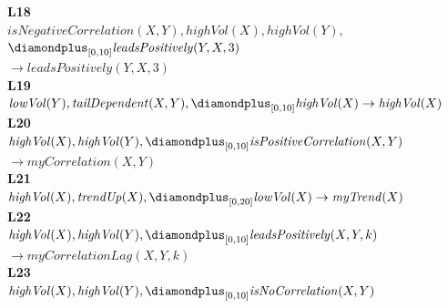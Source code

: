 \begin{figure}[t]
{\begin{minipage}{0.95\textwidth}
\textbf{L18}\\
\hspace*{1.5em}\mbox{$\mathit{isNegativeCorrelation}(X,Y), \mathit{highVol}(X), \mathit{highVol}(Y),$}\\
\hspace*{1.5em}\hspace*{1.5em}\mbox{$\diamondplus_{[0,10]} \mathit{leadsPositively}(Y,X,3)$}\\
\hspace*{1.5em}\hspace*{3em}\mbox{$\to \mathit{leadsPositively}(Y,X,3)$}\\[4pt]
\textbf{L19}\\
\hspace*{1.5em}\mbox{$\mathit{lowVol}(Y), \mathit{tailDependent}(X,Y), \diamondplus_{[0,10]} \mathit{highVol}(X) \to \mathit{highVol}(X)$}\\[4pt]
\textbf{L20}\\
\hspace*{1.5em}\mbox{$\mathit{highVol}(X), \mathit{highVol}(Y), \diamondplus_{[0,10]} \mathit{isPositiveCorrelation}(X,Y)$}\\
\hspace*{1.5em}\hspace*{3em}\mbox{$\to \mathit{myCorrelation}(X,Y)$}\\[4pt]
\textbf{L21}\\
\hspace*{1.5em}\mbox{$\mathit{highVol}(X), \mathit{trendUp}(X), \diamondplus_{[0,20]} \mathit{lowVol}(X) \to \mathit{myTrend}(X)$}\\[4pt]
\textbf{L22}\\
\hspace*{1.5em}\mbox{$\mathit{highVol}(X), \mathit{highVol}(Y), \diamondplus_{[0,10]} \mathit{leadsPositively}(X,Y,k)$}\\
\hspace*{1.5em}\hspace*{3em}\mbox{$\to \mathit{myCorrelationLag}(X,Y,k)$}\\[4pt]
\textbf{L23}\\
\hspace*{1.5em}\mbox{$\mathit{highVol}(X), \mathit{highVol}(Y), \diamondplus_{[0,10]} \mathit{isNoCorrelation}(X,Y)$}\\

\end{minipage}}
\end{figure}

